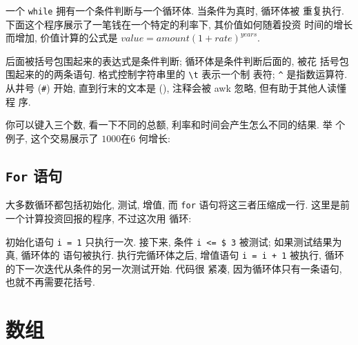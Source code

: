 一个 \texttt{while} 拥有一个条件判断与一个循环体. 当条件为真时, 循环体被
重复执行. 下面这个程序展示了一笔钱在一个特定的利率下, 其价值如何随着投资
时间的增长而增加, 价值计算的公式是 $value = amount (1 + rate)^{years}$.
\while 后面被括号包围起来的表达式是条件判断; 循环体是条件判断后面的, 被花
括号包围起来的的两条语句. \printf 格式控制字符串里的 \verb'\t' 表示一个制
表符; \verb'^' 是指数运算符. 从井号 (\verb'#') 开始, 直到行末的文本是
 (), 注释会被 awk 忽略, 但有助于其他人读懂程
序.

你可以键入三个数, 看一下不同的总额, 利率和时间会产生怎么不同的结果. 举
个例子, 这个交易展示了 $1000 在 $6%
何增长:

\subsection{\texttt{For} 语句}
\label{subsec:for_statement}
大多数循环都包括初始化, 测试, 增值, 而 \texttt{for} 语句将这三者压缩成一行.
这里是前一个计算投资回报的程序, 不过这次用 \for 循环:
初始化语句 \texttt{i = 1} 只执行一次. 接下来, 条件 \verb'i <= $ 3' 被测试;
如果测试结果为真, 循环体的 \printf 语句被执行. 执行完循环体之后, 增值语句
\texttt{i = i + 1} 被执行, 循环的下一次迭代从条件的另一次测试开始. 代码很
紧凑, 因为循环体只有一条语句, 也就不再需要花括号.

\section{数组}
\label{sec:arrays}

